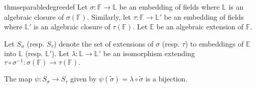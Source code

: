 \begin{restatable}[]{thm}{separabledegreedef}
\label{thm:separabledegreedef}
    Let $\sigma : \mathbb{F} \to \mathbb{L}$ be an embedding of fields where $\mathbb{L}$ is an algebraic closure of $\sigma(\mathbb{F}).$ Similarly, let $\tau : \mathbb{F} \to \mathbb{L}'$ be an embedding of fields where $\mathbb{L}'$ is an algebraic closure of $\tau(\mathbb{F}).$ Let $\mathbb{E}$ be an algebraic extension of $\mathbb{F}.$

    Let $S_\sigma$ (resp. $S_\tau$) denote the set of extensions of $\sigma$ (resp. $\tau$) to embeddings of $\mathbb{E}$ into $\mathbb{L}$ (resp. $\mathbb{L}'$). Let $\lambda : \mathbb{L} \to \mathbb{L}'$ be an isomorphism extending $\tau \circ \sigma^{-1} : \sigma(\mathbb{F}) \to \tau(\mathbb{F}).$  

    The map $\psi : S_\sigma \to S_\tau$ given by $\psi(\widetilde{\sigma}) = \lambda \circ \widetilde{\sigma}$ is a bijection. \hfill\hyperref[thm:separabledegreedef2]{\downsym}

    \begin{center}
    \end{center}  
\end{restatable}

